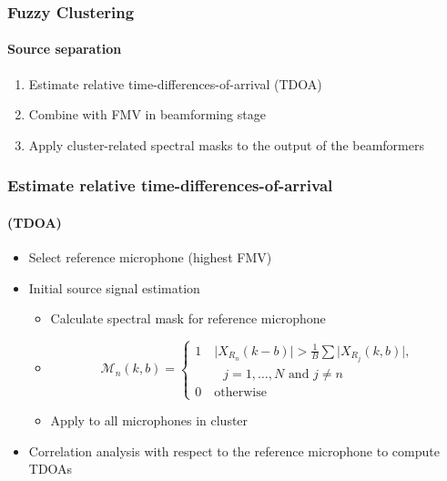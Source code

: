 \documentclass[aspectratio=169]{beamer}
\begin{document}
\begin{frame}
    \frametitle{Fuzzy Clustering}
    \framesubtitle{Source separation}
      \begin{enumerate}
        \itemsep.5cm
        \item Estimate relative time-differences-of-arrival (TDOA)
        \item Combine with FMV in beamforming stage
        \item Apply cluster-related spectral masks to the output of the beamformers
        
    \end{enumerate}
   
\end{frame}

\begin{frame}
    \frametitle{Estimate relative time-differences-of-arrival}
    \framesubtitle{(TDOA)}
      \begin{itemize}

        \item Select reference microphone (highest FMV)
      \item Initial source signal estimation
              \begin{itemize}
              \item  Calculate spectral mask for reference microphone
              \item
              \begin{equation}
                  \mathscr{M}_n(k,b) = 
                  \begin{cases} 
                    1 \quad \vert X_{R_n}(k-b)\vert > \frac 1 B \sum \vert X_{R_j}(k,b)\vert, \\\ 
                    \quad \quad j = 1, \dots ,N \text{ and } j \neq n \\
                    0 \quad \text{otherwise}
                \end{cases}
              \end{equation}
              
            \item Apply to all microphones in cluster
            \end{itemize}
        
        \item Correlation analysis with respect to the reference microphone to compute TDOAs
      
        
    \end{itemize}
   
\end{frame}
\end{document}
